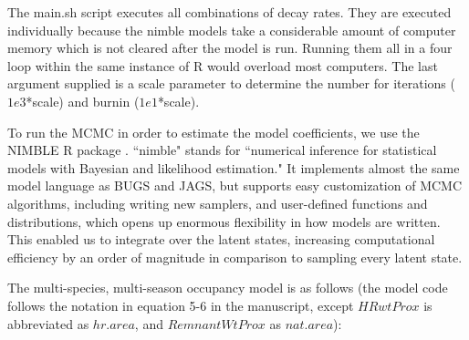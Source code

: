 \documentclass{article}\usepackage[]{graphicx}\usepackage[]{color}
\begin{document}
 The main.sh script executes all combinations of decay
rates. They are executed individually because the nimble models take a
considerable amount of computer memory which is not cleared after the
model is run. Running them all in a four loop within the same instance
of R would overload most computers. The last argument supplied is a
scale parameter to determine the number for iterations ($1e3$*scale)
and burnin ($1e1$*scale).

To run the MCMC in order to estimate the model coefficients, we use the
NIMBLE R package \citep{nimble-14, de2017programming}.  ``nimble"
stands for ``numerical inference for statistical models with Bayesian
and likelihood estimation."  It implements almost the same model
language as BUGS and JAGS, but supports easy customization of MCMC
algorithms, including writing new samplers, and user-defined functions
and distributions, which opens up enormous flexibility in how models
are written. This enabled us to integrate over the latent states,
increasing computational efficiency by an order of magnitude in
comparison to sampling every latent state. 


The multi-species, multi-season occupancy model is as follows (the
model code follows the notation in equation 5-6 in the manuscript,
except $HRwtProx$ is abbreviated as $hr.area$, and $RemnantWtProx$ as
$nat.area$):
\end{document}
